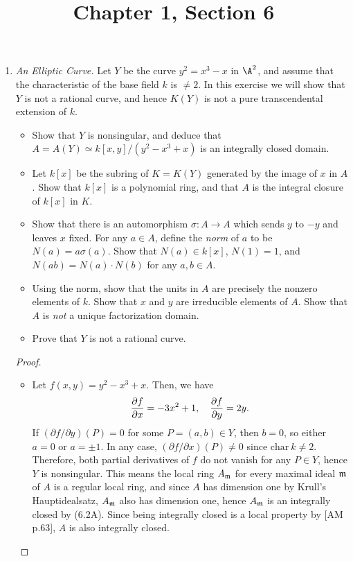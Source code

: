 \documentclass[a4paper]{article}
\title{Chapter 1, Section 6}
\begin{document}
\maketitle
\begin{enumerate} [label=\textbf{\arabic*.}, leftmargin=0cm]


\item[\textbf{2.}] \textit{An Elliptic Curve.} Let $Y$ be the curve $y^2 = x^3 - x$ in $\A^2$, and assume that the characteristic of the base field $k$ is $\neq 2$. In this exercise we will show that $Y$ is not a rational curve, and hence $K(Y)$ is not a pure transcendental extension of $k$.
\begin{itemize}
    \item[(a)] Show that $Y$ is nonsingular, and deduce that $A = A(Y) \simeq k[x, y] / (y^2 - x^3 + x)$ is an integrally closed domain.
    \item[(b)] Let $k[x]$ be the subring of $K = K(Y)$ generated by the image of $x$ in $A$. Show that $k[x]$ is a polynomial ring, and that $A$ is the integral closure of $k[x]$ in $K$.
    \item[(c)] Show that there is an automorphism $\sigma : A \to A$ which sends $y$ to $-y$ and leaves $x$ fixed. For any $a \in A$, define the \textit{norm} of $a$ to be $N(a) = a \sigma(a)$. Show that $N(a) \in k[x]$, $N(1) = 1$, and $N(ab) = N(a) \cdot N(b)$ for any $a, b \in A$.
    \item[(d)] Using the norm, show that the units in $A$ are precisely the nonzero elements of $k$. Show that $x$ and $y$ are irreducible elements of $A$. Show that $A$ is \textit{not} a unique factorization domain.
    \item[(e)] Prove that $Y$ is not a rational curve. 
\end{itemize}

\begin{proof} $ $ \vspace{0pt}
  \begin{itemize} [leftmargin=0cm]
    \item[(a)] Let $f(x, y) = y^2 - x^3 + x$. Then, we have
    \begin{equation*}
      \pdv{f}{x} = -3x^2 + 1, \quad \pdv{f}{y} = 2y.
    \end{equation*}
    If $(\partial f / \partial y)(P) = 0$ for some $P = (a, b) \in Y$, then $b = 0$, so either $a = 0$ or $a = \pm 1$. In any case, $(\partial f / \partial x)(P) \neq 0$ since $\text{char}~k \neq 2$. Therefore, both partial derivatives of $f$ do not vanish for any $P \in Y$, hence $Y$ is nonsingular. This means the local ring $A_{\mathfrak{m}}$ for every maximal ideal $\mathfrak{m}$ of $A$ is a regular local ring, and since $A$ has dimension one by Krull's Hauptidealsatz, $A_{\mathfrak{m}}$ also has dimension one, hence $A_{\mathfrak{m}}$ is an integrally closed by (6.2A). Since being integrally closed is a local property by [AM p.63], $A$ is also integrally closed.


\end{itemize}
\end{proof}
\end{enumerate}
\end{document}
